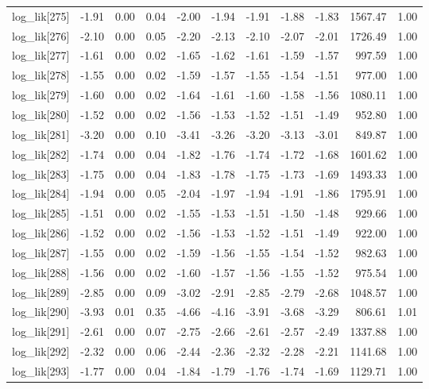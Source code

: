 \begin{table}[ht]
\begin{tabular}{rrrrrrrrrrr}
  log\_lik[275] & -1.91 & 0.00 & 0.04 & -2.00 & -1.94 & -1.91 & -1.88 & -1.83 & 1567.47 & 1.00 \\ 
  log\_lik[276] & -2.10 & 0.00 & 0.05 & -2.20 & -2.13 & -2.10 & -2.07 & -2.01 & 1726.49 & 1.00 \\ 
  log\_lik[277] & -1.61 & 0.00 & 0.02 & -1.65 & -1.62 & -1.61 & -1.59 & -1.57 & 997.59 & 1.00 \\ 
  log\_lik[278] & -1.55 & 0.00 & 0.02 & -1.59 & -1.57 & -1.55 & -1.54 & -1.51 & 977.00 & 1.00 \\ 
  log\_lik[279] & -1.60 & 0.00 & 0.02 & -1.64 & -1.61 & -1.60 & -1.58 & -1.56 & 1080.11 & 1.00 \\ 
  log\_lik[280] & -1.52 & 0.00 & 0.02 & -1.56 & -1.53 & -1.52 & -1.51 & -1.49 & 952.80 & 1.00 \\ 
  log\_lik[281] & -3.20 & 0.00 & 0.10 & -3.41 & -3.26 & -3.20 & -3.13 & -3.01 & 849.87 & 1.00 \\ 
  log\_lik[282] & -1.74 & 0.00 & 0.04 & -1.82 & -1.76 & -1.74 & -1.72 & -1.68 & 1601.62 & 1.00 \\ 
  log\_lik[283] & -1.75 & 0.00 & 0.04 & -1.83 & -1.78 & -1.75 & -1.73 & -1.69 & 1493.33 & 1.00 \\ 
  log\_lik[284] & -1.94 & 0.00 & 0.05 & -2.04 & -1.97 & -1.94 & -1.91 & -1.86 & 1795.91 & 1.00 \\ 
  log\_lik[285] & -1.51 & 0.00 & 0.02 & -1.55 & -1.53 & -1.51 & -1.50 & -1.48 & 929.66 & 1.00 \\ 
  log\_lik[286] & -1.52 & 0.00 & 0.02 & -1.56 & -1.53 & -1.52 & -1.51 & -1.49 & 922.00 & 1.00 \\ 
  log\_lik[287] & -1.55 & 0.00 & 0.02 & -1.59 & -1.56 & -1.55 & -1.54 & -1.52 & 982.63 & 1.00 \\ 
  log\_lik[288] & -1.56 & 0.00 & 0.02 & -1.60 & -1.57 & -1.56 & -1.55 & -1.52 & 975.54 & 1.00 \\ 
  log\_lik[289] & -2.85 & 0.00 & 0.09 & -3.02 & -2.91 & -2.85 & -2.79 & -2.68 & 1048.57 & 1.00 \\ 
  log\_lik[290] & -3.93 & 0.01 & 0.35 & -4.66 & -4.16 & -3.91 & -3.68 & -3.29 & 806.61 & 1.01 \\ 
  log\_lik[291] & -2.61 & 0.00 & 0.07 & -2.75 & -2.66 & -2.61 & -2.57 & -2.49 & 1337.88 & 1.00 \\ 
  log\_lik[292] & -2.32 & 0.00 & 0.06 & -2.44 & -2.36 & -2.32 & -2.28 & -2.21 & 1141.68 & 1.00 \\ 
  log\_lik[293] & -1.77 & 0.00 & 0.04 & -1.84 & -1.79 & -1.76 & -1.74 & -1.69 & 1129.71 & 1.00 \\ 

\end{tabular}
\end{table}
